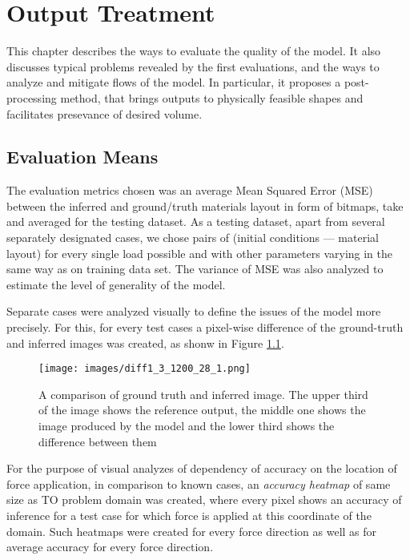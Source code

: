 
\chapter{Output Treatment}

This chapter describes the ways to evaluate the quality of the model.
It also discusses typical problems revealed by the first evaluations, and the ways to analyze and mitigate flows of the model.
In particular, it proposes a post-processing method, that brings outputs to physically feasible shapes and facilitates presevance of desired volume.
\medskip

\section{Evaluation Means}

The evaluation metrics chosen was an average Mean Squared Error (MSE) between the inferred and ground/truth materials layout in form of bitmaps, take and averaged for the testing dataset. 
As a testing dataset, apart from several separately designated cases, we chose pairs of (initial conditions --- material layout) for every single load possible and with other parameters varying in the same way as on training data set.
The variance of MSE was also analyzed to estimate the level of generality of the model.
\medskip

Separate cases were analyzed visually to define the issues of the model more precisely.
For this, for  every test cases a pixel-wise difference of the ground-truth and inferred images was created, as shonw in Figure \ref{fig:diff_example}.
\begin{figure}[h]
	\centering
	\texttt{[image: images/diff1\_3\_1200\_28\_1.png]}
	\label{fig:diff_example}
	\caption{A comparison of ground truth and inferred image. The upper third of the image shows the reference output, the middle one shows the image produced by the model and the lower third shows the difference between them}
\end{figure}
\medskip

For the purpose of visual analyzes of dependency of accuracy on the location of force application, in comparison to known cases, an \textit{accuracy heatmap} of same size as TO problem domain was created, where every pixel shows an accuracy of inference for a test case for which force is applied at this coordinate of the domain. 
Such heatmaps were created for every force direction as well as for average accuracy for every force direction.
\medskip


